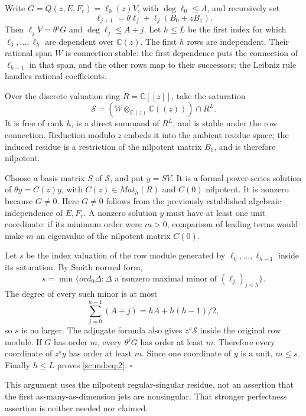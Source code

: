 \documentclass[11pt,a4paper]{article}
\theoremstyle{definition}
\theoremstyle{remark}
\theoremstyle{plain}
\numberwithin{equation}{section}
\def\operatorname#1{#1}\def\mathrm#1{#1}}
\begin{document}
Write \(G=Q(z,E,F_r)=\ell_0(z)V\), with \(\deg\ell_0\le A\), and
recursively set \[
\ell_{j+1}=\theta\ell_j+\ell_j(B_0+zB_1).
\] Then \(\ell_jV=\theta^jG\) and \(\deg\ell_j\le A+j\). Let \(h\le L\)
be the first index for which \(\ell_0,\ldots,\ell_h\) are dependent over
\(\mathbb C(z)\). The first \(h\) rows are independent. Their rational
span \(W\) is connection-stable: the first dependence puts the
connection of \(\ell_{h-1}\) in that span, and the other rows map to
their successors; the Leibniz rule handles rational coefficients.

Over the discrete valuation ring \(R=\mathbb C[[z]]\), take the
saturation \[
\mathcal S=(W\otimes_{\mathbb C(z)}\mathbb C((z)))\cap R^L.
\] It is free of rank \(h\), is a direct summand of \(R^L\), and is
stable under the row connection. Reduction modulo \(z\) embeds it into
the ambient residue space; the induced residue is a restriction of the
nilpotent matrix \(B_0\), and is therefore nilpotent.

Choose a basis matrix \(S\) of \(\mathcal S\), and put \(y=SV\). It is a
formal power-series solution of \(\theta y=C(z)y\), with
\(C(z)\in\operatorname{Mat}_h(R)\) and \(C(0)\) nilpotent. It is nonzero
because \(G\ne0\). Here \(G\ne0\) follows from the previously
established algebraic independence of \(E,F_r\). A nonzero solution
\(y\) must have at least one unit coordinate: if its minimum order were
\(m>0\), comparison of leading terms would make \(m\) an eigenvalue of
the nilpotent matrix \(C(0)\).

Let \(s\) be the index valuation of the row module generated by
\(\ell_0,\ldots,\ell_{h-1}\) inside its saturation. By Smith normal
form, \[
s=\min\{\operatorname{ord}_0\Delta:
\Delta\text{ a nonzero maximal minor of }(\ell_j)_{j<h}\}.
\] The degree of every such minor is at most \[
\sum_{j=0}^{h-1}(A+j)=hA+h(h-1)/2,
\] so \(s\) is no larger. The adjugate formula also gives
\(z^s\mathcal S\) inside the original row module. If \(G\) has order
\(m\), every \(\theta^jG\) has order at least \(m\). Therefore every
coordinate of \(z^sy\) has order at least \(m\). Since one coordinate of
\(y\) is a unit, \(m\le s\). Finally \(h\le L\) proves \eqref{sc:md:eq:2}. \(\square\)

This argument uses the nilpotent regular-singular residue, not an
assertion that the first as-many-as-dimension jets are nonsingular. That
stronger perfectness assertion is neither needed nor claimed.
\end{document}
